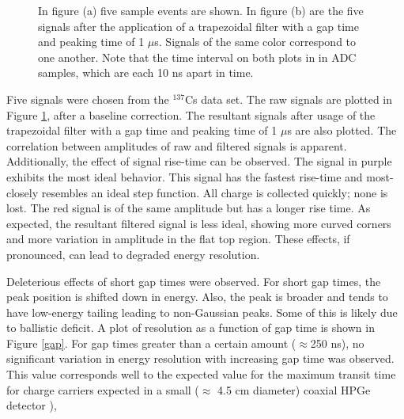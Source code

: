 \begin{figure}%
    \centering
    \quad
    \caption{In figure (a) five sample events are shown. In figure (b) are the five signals after the application of a trapezoidal filter with a gap time and peaking time of 1 $\mu$s. Signals of the same color correspond to one another. Note that the time interval on both plots in in ADC samples, which are each 10 ns apart in time.}%
    \label{fig:signals}%
\end{figure}

Five signals were chosen from the ${}^{137}${Cs} data set. The raw signals are plotted in Figure \ref{fig:signals}, after a baseline correction. The resultant signals after usage of the trapezoidal filter with a gap time and peaking time of 1 $\mu$s are also plotted. The correlation between amplitudes of raw and filtered signals is apparent. Additionally, the effect of signal rise-time can be observed. The signal in purple exhibits the most ideal behavior. This signal has the fastest rise-time and most-closely resembles an ideal step function. All charge is collected quickly; none is lost. The red signal is of the same amplitude but has a longer rise time. As expected, the resultant filtered signal is less ideal, showing more curved corners and more variation in amplitude in the flat top region. These effects, if pronounced, can lead to degraded energy resolution.

Deleterious effects of short gap times were observed. For short gap times, the peak position is shifted down in energy. Also, the peak is broader and tends to have low-energy tailing leading to non-Gaussian peaks. Some of this is likely due to ballistic deficit. A plot of resolution as a function of gap time is shown in Figure \ref{gap}. For gap times greater than a certain amount ($\approx$250 ns), no significant variation in energy resolution with increasing gap time was observed. This value corresponds well to the expected value for the maximum transit time for charge carriers expected in a small ($\approx$ 4.5 cm diameter) coaxial HPGe detector \cite{Knoll} ),

